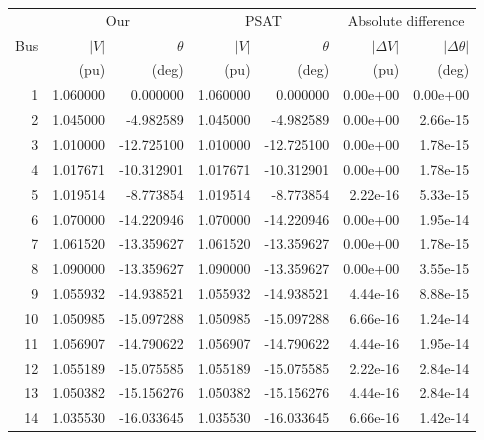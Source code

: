 \begin{tabular}{r rr rr rr}\toprule
& \multicolumn{2}{c}{Our} & \multicolumn{2}{c}{PSAT} & \multicolumn{2}{c}{Absolute difference} \\ 
Bus & {$|V|$} & {$\theta$} & {$|V|$} & {$\theta$} & {$|\Delta V|$} & {$|\Delta\theta|$} \\ 
{} & {(pu)} & {(deg)} & {(pu)} & {(deg)} & {(pu)} & {(deg)} \\ \midrule
1 & 1.060000 & 0.000000 & 1.060000 & 0.000000 & 0.00e+00 & 0.00e+00 \\
2 & 1.045000 & -4.982589 & 1.045000 & -4.982589 & 0.00e+00 & 2.66e-15 \\
3 & 1.010000 & -12.725100 & 1.010000 & -12.725100 & 0.00e+00 & 1.78e-15 \\
4 & 1.017671 & -10.312901 & 1.017671 & -10.312901 & 0.00e+00 & 1.78e-15 \\
5 & 1.019514 & -8.773854 & 1.019514 & -8.773854 & 2.22e-16 & 5.33e-15 \\
6 & 1.070000 & -14.220946 & 1.070000 & -14.220946 & 0.00e+00 & 1.95e-14 \\
7 & 1.061520 & -13.359627 & 1.061520 & -13.359627 & 0.00e+00 & 1.78e-15 \\
8 & 1.090000 & -13.359627 & 1.090000 & -13.359627 & 0.00e+00 & 3.55e-15 \\
9 & 1.055932 & -14.938521 & 1.055932 & -14.938521 & 4.44e-16 & 8.88e-15 \\
10 & 1.050985 & -15.097288 & 1.050985 & -15.097288 & 6.66e-16 & 1.24e-14 \\
11 & 1.056907 & -14.790622 & 1.056907 & -14.790622 & 4.44e-16 & 1.95e-14 \\
12 & 1.055189 & -15.075585 & 1.055189 & -15.075585 & 2.22e-16 & 2.84e-14 \\
13 & 1.050382 & -15.156276 & 1.050382 & -15.156276 & 4.44e-16 & 2.84e-14 \\
14 & 1.035530 & -16.033645 & 1.035530 & -16.033645 & 6.66e-16 & 1.42e-14 \\
\bottomrule\end{tabular}

